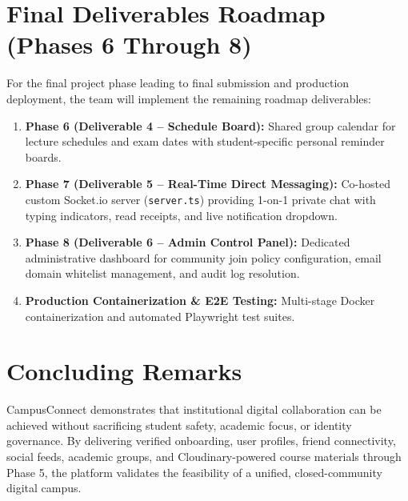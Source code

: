 \documentclass[11pt,a4paper]{report}
\begin{document}
\section{Final Deliverables Roadmap (Phases 6 Through 8)}

For the final project phase leading to final submission and production deployment, the team will implement the remaining roadmap deliverables:

\begin{enumerate}
    \item \textbf{Phase 6 (Deliverable 4 -- Schedule Board):} Shared group calendar for lecture schedules and exam dates with student-specific personal reminder boards.
    \item \textbf{Phase 7 (Deliverable 5 -- Real-Time Direct Messaging):} Co-hosted custom Socket.io server (\texttt{server.ts}) providing 1-on-1 private chat with typing indicators, read receipts, and live notification dropdown.
    \item \textbf{Phase 8 (Deliverable 6 -- Admin Control Panel):} Dedicated administrative dashboard for community join policy configuration, email domain whitelist management, and audit log resolution.
    \item \textbf{Production Containerization \& E2E Testing:} Multi-stage Docker containerization and automated Playwright test suites.
\end{enumerate}

\section{Concluding Remarks}

CampusConnect demonstrates that institutional digital collaboration can be achieved without sacrificing student safety, academic focus, or identity governance. By delivering verified onboarding, user profiles, friend connectivity, social feeds, academic groups, and Cloudinary-powered course materials through Phase 5, the platform validates the feasibility of a unified, closed-community digital campus.
\end{document}
